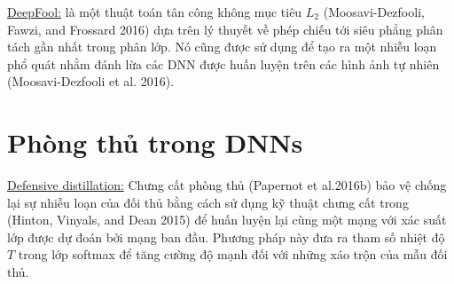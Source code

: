 \underline{DeepFool:} là một thuật toán tân công không mục tiêu $L_2$ (Moosavi-Dezfooli, 
Fawzi, and Frossard 2016) dựa trên lý thuyết về phép chiếu tới siêu phẳng phân tách gần nhất
trong phân lớp. Nó cũng được sử dụng để tạo ra một nhiễu loạn phổ quát nhằm đánh lừa 
các DNN được huấn luyện trên các hình ảnh tự nhiên (Moosavi-Dezfooli et al. 2016).

\section{Phòng thủ trong DNNs}
\underline{Defensive distillation:} Chưng cất phòng thủ (Papernot et al.2016b) bảo vệ 
chống lại sự nhiễu loạn của đối thủ bằng cách sử dụng kỹ thuật chưng cất trong (Hinton, 
Vinyals, and Dean 2015) để huấn luyện lại cùng một mạng với xác suất lớp được dự đoán bởi 
mạng ban đầu. Phương pháp này đưa ra tham số nhiệt độ $T$ trong lớp softmax để tăng cường 
độ mạnh đối với những xáo trộn của mẫu đối thủ.
